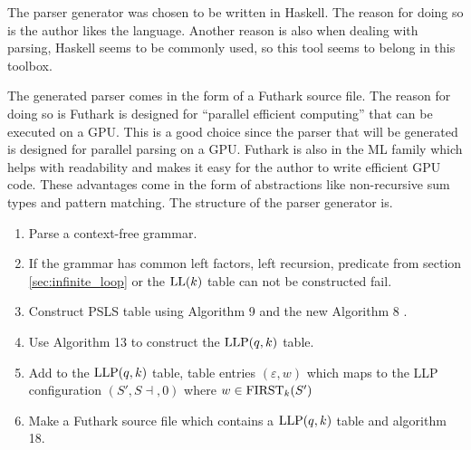 The parser generator was chosen to be written in Haskell. The reason for doing so is the author likes the language. Another reason is also when dealing with parsing, Haskell seems to be commonly used, so this tool seems to belong in this toolbox.

The generated parser comes in the form of a Futhark source file. The reason for doing so is Futhark is designed for ``parallel efficient computing'' \cite{futhark:homepage} that can be executed on a GPU. This is a good choice since the parser that will be generated is designed for parallel parsing on a GPU. Futhark is also in the ML family which helps with readability and makes it easy for the author to write efficient GPU code. These advantages come in the form of abstractions like non-recursive sum types and pattern matching. The structure of the parser generator is.
\begin{enumerate}
    \item Parse a context-free grammar.
    \item If the grammar has common left factors, left recursion, predicate from section \ref{sec:infinite_loop} or the $\text{LL}(k)$ table can not be constructed fail.
    \item Construct PSLS table using Algorithm 9 and the new Algorithm 8 \cite[13]{Vagner2007}.
    \item Use Algorithm 13 \cite[13]{Vagner2007} to construct the $\text{LLP}(q, k)$ table.
    \item Add to the $\text{LLP}(q, k)$ table, table entries $(\varepsilon, w)$ which maps to the LLP configuration $(S', S \dashv, 0)$ where $w \in \text{FIRST}_k(S')$
    \item Make a Futhark source file which contains a $\text{LLP}(q, k)$ table and algorithm 18.
\end{enumerate}